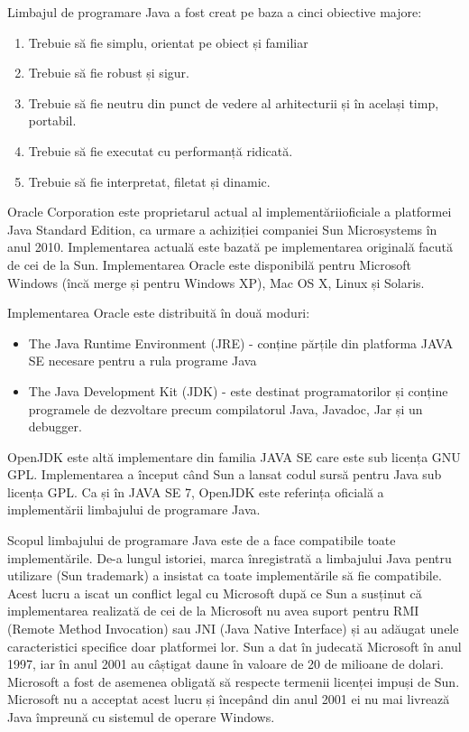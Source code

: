 \documentclass[12pt]{book}
\begin{document}
Limbajul de programare Java a fost creat pe baza a cinci obiective majore:
\begin{addmargin}[4em]{1em}
\begin{enumerate}
	\item Trebuie să fie simplu, orientat pe obiect și familiar		\item Trebuie să fie robust și sigur.
	\item Trebuie să fie neutru din punct de vedere al arhitecturii și în același timp, portabil.
	\item Trebuie să fie executat cu performanță ridicată.
	\item Trebuie să fie interpretat, filetat și dinamic.
\end{enumerate}
\end{addmargin}
\bigbreak
Oracle Corporation este proprietarul actual al implementăriioficiale a platformei Java Standard Edition, ca urmare a achiziției companiei Sun Microsystems în anul 2010. Implementarea actuală este bazată pe implementarea originală facută de cei de la Sun. Implementarea Oracle este disponibilă pentru Microsoft Windows (încă merge și pentru Windows XP), Mac OS X, Linux și Solaris.
	
Implementarea Oracle este distribuită în două moduri:
\begin{addmargin}[4em]{1em}
\begin{itemize}
\item The Java Runtime Environment (JRE) - conține părțile din platforma JAVA SE necesare pentru a rula programe Java 
\item The Java Development Kit (JDK) - este destinat programatorilor și conține programele de dezvoltare precum compilatorul Java, Javadoc, Jar și un debugger.	
\end{itemize}
\end{addmargin}
\bigbreak
OpenJDK este altă implementare din familia JAVA SE care este sub licența GNU GPL. Implementarea a început când Sun a lansat codul sursă pentru Java sub licența GPL. Ca și în JAVA SE 7, OpenJDK este referința oficială a implementării limbajului de programare Java.

Scopul limbajului de programare Java este de a face compatibile toate implementările. De-a lungul istoriei, marca înregistrată a limbajului Java pentru utilizare (Sun trademark) a insistat ca toate implementările să fie compatibile. Acest lucru a iscat un conflict legal cu Microsoft după ce Sun a susținut că implementarea realizată de cei de la Microsoft nu avea suport pentru RMI (Remote Method Invocation) sau JNI (Java Native Interface) și au adăugat unele caracteristici specifice doar platformei lor. Sun a dat în judecată Microsoft în anul 1997, iar în anul 2001 au câștigat daune în valoare de 20 de milioane de dolari. Microsoft a fost de asemenea obligată să respecte termenii licenței impuși de Sun. Microsoft nu a acceptat acest lucru și începând din anul 2001 ei nu mai livrează Java împreună cu sistemul de operare Windows.
\end{document}
